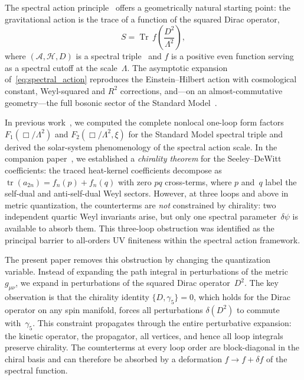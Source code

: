 \documentclass[12pt,a4paper]{article}
\theoremstyle{definition}
\theoremstyle{remark}
\newcommand{\Tr}{\operatorname{Tr}}
\newcommand{\tr}{\operatorname{tr}}
\newcommand{\Lam}{\Lambda}
\newcommand{\Hilb}{\mathcal{H}}
\newcommand{\Alg}{\mathcal{A}}
\begin{document}
The spectral action principle~\cite{Chamseddine:1996zu, Chamseddine:2006ep}
offers a geometrically natural starting point: the gravitational action is the
trace of a function of the squared Dirac operator,
\begin{equation}\label{eq:spectral_action}
  S = \Tr\,f\!\left(\frac{D^2}{\Lam^2}\right),
\end{equation}
where $(\Alg, \Hilb, D)$ is a spectral triple~\cite{Connes:1994book,
Connes:1995cr} and $f$ is a positive even function serving as a spectral
cutoff at the scale~$\Lam$.  The asymptotic expansion of~\eqref{eq:spectral_action}
reproduces the Einstein--Hilbert action with cosmological constant, Weyl-squared
and $R^2$ corrections, and---on an almost-commutative geometry---the full bosonic
sector of the Standard Model~\cite{Chamseddine:2010ud, vanSuijlekom:2014pya}.

In previous work~\cite{Alfyorov:2026ff, Alfyorov:2026ss}, we computed the
complete nonlocal one-loop form factors $F_1(\Box/\Lam^2)$ and
$F_2(\Box/\Lam^2, \xi)$ for the Standard Model spectral triple and derived the
solar-system phenomenology of the spectral action scale.  In the companion
paper~\cite{Alfyorov:2026ct}, we established a \emph{chirality theorem} for the
Seeley--DeWitt coefficients: the traced heat-kernel coefficients decompose
as $\tr(a_{2n}) = f_n(p) + f_n(q)$ with zero $pq$ cross-terms, where $p$
and~$q$ label the self-dual and anti-self-dual Weyl sectors.  However, at
three loops and above in metric quantization, the counterterms are \emph{not}
constrained by chirality: two independent quartic Weyl invariants arise, but
only one spectral parameter~$\delta\psi$ is available to absorb them.  This
three-loop obstruction was identified as the principal barrier to
all-orders UV finiteness within the spectral action framework.

The present paper removes this obstruction by changing the quantization
variable.  Instead of expanding the path integral in perturbations of the
metric~$g_{\mu\nu}$, we expand in perturbations of the squared Dirac
operator~$D^2$.  The key observation is that the chirality identity
$\{D, \gamma_5\} = 0$, which holds for the Dirac operator on any spin
manifold, forces all perturbations $\delta(D^2)$ to commute with~$\gamma_5$.
This constraint propagates through the entire perturbative expansion: the
kinetic operator, the propagator, all vertices, and hence all loop integrals
preserve chirality.  The counterterms at every loop order are block-diagonal
in the chiral basis and can therefore be absorbed by a deformation
$f \to f + \delta f$ of the spectral function.
\end{document}
